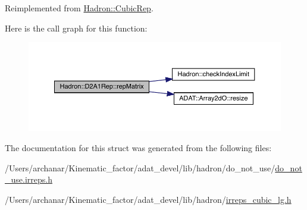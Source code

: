 Reimplemented from \mbox{\hyperlink{structHadron_1_1CubicRep_ac5d7e9e6f4ab1158b5fce3e4ad9e8005}{Hadron\+::\+Cubic\+Rep}}.

Here is the call graph for this function\+:
\nopagebreak
\begin{figure}[H]
\begin{center}
\leavevmode
\includegraphics[width=350pt]{d5/d28/structHadron_1_1D2A1Rep_a0d9bec731ada6fec10956dce667b2ffd_cgraph}
\end{center}
\end{figure}


The documentation for this struct was generated from the following files\+:\begin{DoxyCompactItemize}
\item 
/\+Users/archanar/\+Kinematic\+\_\+factor/adat\+\_\+devel/lib/hadron/do\+\_\+not\+\_\+use/\mbox{\hyperlink{do__not__use_8irreps_8h}{do\+\_\+not\+\_\+use.\+irreps.\+h}}\item 
/\+Users/archanar/\+Kinematic\+\_\+factor/adat\+\_\+devel/lib/hadron/\mbox{\hyperlink{lib_2hadron_2irreps__cubic__lg_8h}{irreps\+\_\+cubic\+\_\+lg.\+h}}\end{DoxyCompactItemize}
